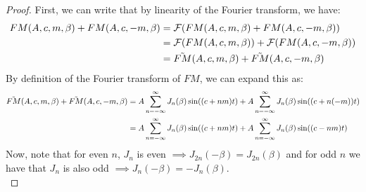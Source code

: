 \documentclass[11pt,twoside]{report}
\numberwithin{thm}{section}
\numberwithin{equation}{section}
\begin{document}
\begin{proof} First, we can write that by linearity of the Fourier transform, we have:
\begin{align*}
    FM(A, c, m, \beta) + FM(A, c, -m, \beta) &= \mathcal{F}(FM(A, c, m, \beta) + FM(A, c, -m, \beta)) \\
    &= \mathcal{F}(FM(A, c, m, \beta)) + \mathcal{F}(FM(A, c, -m, \beta))\\
    &=\Tilde{FM}(A, c, m, \beta) + \Tilde{FM}(A, c, -m, \beta)
\end{align*}
By definition of the Fourier transform of $FM$, we can expand this as:
\begin{align*}
    \Tilde{FM}(A, c, m, \beta) + \Tilde{FM}(A, c, -m, \beta) &= A \sum_{n=-\infty}^\infty J_n(\beta) \sin((c + nm)t) + A \sum_{n=-\infty}^\infty J_n(\beta) \sin((c + n(-m))t)\\
    &= A \sum_{n=-\infty}^\infty J_n(\beta) \sin((c + nm)t) + A \sum_{n=-\infty}^\infty J_n(\beta) \sin((c - nm)t)
\end{align*}
Now, note that for even $n$, $J_n$ is even $\implies J_{2n}(-\beta) = J_{2n}(\beta)$ and for odd $n$ we have that $J_{n}$ is also odd $\implies J_{n}(-\beta) = -J_{n}(\beta)$.\\


\end{proof}
\end{document}
